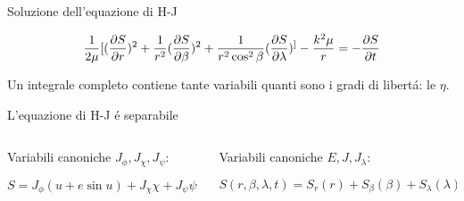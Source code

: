 \begin{frame}{Soluzione dell'equazione di H-J}

\begin{align*}
\frac{1}{2\mu}[(\PDy{r}{S})^2+\frac{1}{r^2}(\PDy{\beta}{S})^2+\frac{1}{r^2\cos^2{\beta}}(\PDy{\lambda}{S})^]-\frac{k^2\mu}{r}=-\PDy{t}{S}
\end{align*}

Un integrale completo contiene tante variabili quanti sono i gradi di libert\'a: le $\eta$.

\begin{block}{L'equazione di H-J \'e separabile}

\begin{columns}

\begin{column}{0.5\textwidth}

Variabili canoniche $J_{\phi}, J_{\chi}, J_{\psi}$:

\begin{equation*}
S=J_{\phi}(u+e\sin{u})+J_{\chi}\chi+J_{\psi}\psi-Et
\end{equation*}

\end{column}

\begin{column}{0.5\textwidth}

Variabili canoniche $E, J, J_{\lambda}$:

\begin{equation*}
S(r,\beta,\lambda,t)=S_r(r)+S_{\beta}(\beta)+S_{\lambda}(\lambda)-\sigma t
\end{equation*}

\end{column}

\end{columns}



\end{block}


\end{frame}

